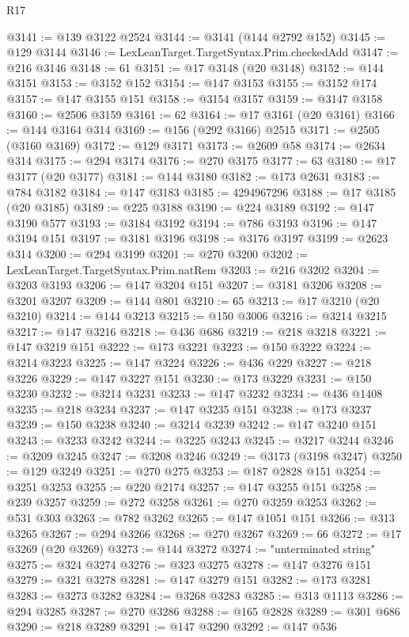\begin{lexlean}{R17}
\begin{coremodule}
@3141 := @139 @3122 @2524
@3144 := @3141 (@144 @2792 @152)
@3145 := @129 @3144
@3146 := LexLeanTarget.TargetSyntax.Prim.checkedAdd
@3147 := @216 @3146
@3148 := 61
@3151 := @17 @3148 (@20 @3148)
@3152 := @144 @3151
@3153 := @3152 @152
@3154 := @147 @3153
@3155 := @3152 @174
@3157 := @147 @3155 @151
@3158 := @3154 @3157
@3159 := @3147 @3158
@3160 := @2506 @3159
@3161 := 62
@3164 := @17 @3161 (@20 @3161)
@3166 := @144 @3164 @314
@3169 := @156 (@292 @3166) @2515
@3171 := @2505 (@3160 @3169)
@3172 := @129 @3171
@3173 := @2609 @58
@3174 := @2634 @314
@3175 := @294 @3174
@3176 := @270 @3175
@3177 := 63
@3180 := @17 @3177 (@20 @3177)
@3181 := @144 @3180
@3182 := @173 @2631
@3183 := @784 @3182
@3184 := @147 @3183
@3185 := 4294967296
@3188 := @17 @3185 (@20 @3185)
@3189 := @225 @3188
@3190 := @224 @3189
@3192 := @147 @3190 @577
@3193 := @3184 @3192
@3194 := @786 @3193
@3196 := @147 @3194 @151
@3197 := @3181 @3196
@3198 := @3176 @3197
@3199 := @2623 @314
@3200 := @294 @3199
@3201 := @270 @3200
@3202 := LexLeanTarget.TargetSyntax.Prim.natRem
@3203 := @216 @3202
@3204 := @3203 @3193
@3206 := @147 @3204 @151
@3207 := @3181 @3206
@3208 := @3201 @3207
@3209 := @144 @801
@3210 := 65
@3213 := @17 @3210 (@20 @3210)
@3214 := @144 @3213
@3215 := @150 @3006
@3216 := @3214 @3215
@3217 := @147 @3216
@3218 := @436 @686
@3219 := @218 @3218
@3221 := @147 @3219 @151
@3222 := @173 @3221
@3223 := @150 @3222
@3224 := @3214 @3223
@3225 := @147 @3224
@3226 := @436 @229
@3227 := @218 @3226
@3229 := @147 @3227 @151
@3230 := @173 @3229
@3231 := @150 @3230
@3232 := @3214 @3231
@3233 := @147 @3232
@3234 := @436 @1408
@3235 := @218 @3234
@3237 := @147 @3235 @151
@3238 := @173 @3237
@3239 := @150 @3238
@3240 := @3214 @3239
@3242 := @147 @3240 @151
@3243 := @3233 @3242
@3244 := @3225 @3243
@3245 := @3217 @3244
@3246 := @3209 @3245
@3247 := @3208 @3246
@3249 := @3173 (@3198 @3247)
@3250 := @129 @3249
@3251 := @270 @275
@3253 := @187 @2828 @151
@3254 := @3251 @3253
@3255 := @220 @2174
@3257 := @147 @3255 @151
@3258 := @239 @3257
@3259 := @272 @3258
@3261 := @270 @3259 @3253
@3262 := @531 @303
@3263 := @782 @3262
@3265 := @147 @1051 @151
@3266 := @313 @3265
@3267 := @294 @3266
@3268 := @270 @3267
@3269 := 66
@3272 := @17 @3269 (@20 @3269)
@3273 := @144 @3272
@3274 := "unterminated string"
@3275 := @324 @3274
@3276 := @323 @3275
@3278 := @147 @3276 @151
@3279 := @321 @3278
@3281 := @147 @3279 @151
@3282 := @173 @3281
@3283 := @3273 @3282
@3284 := @3268 @3283
@3285 := @313 @1113
@3286 := @294 @3285
@3287 := @270 @3286
@3288 := @165 @2828
@3289 := @301 @686
@3290 := @218 @3289
@3291 := @147 @3290
@3292 := @147 @536

\end{coremodule}
\end{lexlean}
